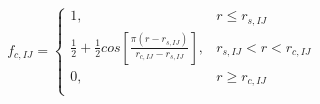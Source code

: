 \documentclass[12pt]{article}
\begin{document}
\begin{eqnarray*}
f_{c,IJ}=\left\{\begin{array}{lr}
1, & r\leq r_{s,IJ} \\
\frac{1}{2}+\frac{1}{2} cos \left[\frac{\pi \left(r-r_{s,IJ}\right)}{r_{c,IJ}-r_{s,IJ}}\right], & r_{s,IJ}<r<r_{c,IJ} \\
0, & r \geq r_{c,IJ} \\
\end{array}\right.
\end{eqnarray*} 
\end{document}

